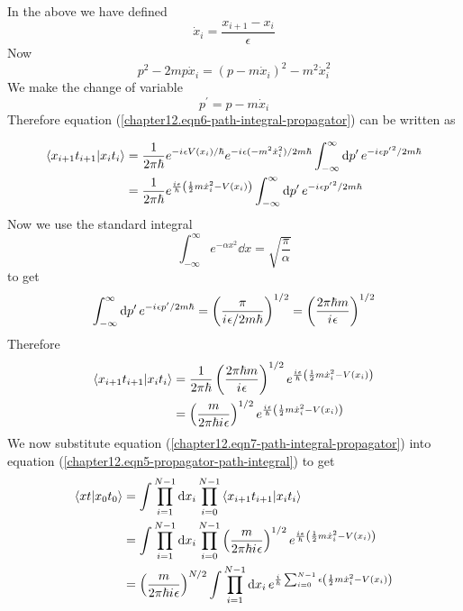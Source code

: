 	In the above we have defined
	\begin{equation}
		\dot{x}_i = \frac{x_{i+1} - x_i}{\epsilon}
	\end{equation}
	Now
	\begin{equation}
		p^2 - 2m p \dot{x}_i = (p- m \dot{x}_i)^2 - m^2 \dot{x}_i^2
	\end{equation}
	We make the change of variable
	\begin{equation}
		p^\prime = p -m \dot{x}_i
	\end{equation}
	Therefore equation (\ref{chapter12.eqn6-path-integral-propagator}) can be written as
	
	\begin{align}
		\braket{x_{i+1} t_{i+1}}{x_i t_i} 
		&= \frac{1}{2 \pi \hbar} e^{-{i\mkern1mu} \epsilon V(x_i)/\hbar} e^{-{i\mkern1mu} \epsilon (-m^2 \dot{x}_i^2) / 2 m \hbar}  \int_{-\infty}^{\infty} \dd{p^\prime} e^{-{i\mkern1mu} \epsilon {p^\prime}^2 / 2 m \hbar} \\
		&= \frac{1}{2 \pi \hbar} e^{\frac{{i\mkern1mu} \epsilon}{\hbar} \left(\frac{1}{2} m \dot{x}_i^2 - V(x_i)\right)} \int_{-\infty}^{\infty} \dd{p^\prime} e^{-{i\mkern1mu} \epsilon {p^\prime}^2 / 2 m \hbar}
	\end{align}
	Now we use the standard integral
	\begin{equation}
		\int_{-\infty}^{\infty} e^{-\alpha x^2} \dd{x} = \sqrt{\frac{\pi}{\alpha}}
	\end{equation}
	to get
	\begin{equation}
		\int_{-\infty}^{\infty} \dd{p^\prime} e^{-{i\mkern1mu} \epsilon p^\prime / 2 m \hbar} = \left(\frac{\pi}{{i\mkern1mu} \epsilon/2 m \hbar}\right)^{1/2} = \left(\frac{2 \pi \hbar m}{{i\mkern1mu} \epsilon}\right)^{1/2}
	\end{equation}
	Therefore
	\begin{align}
		\braket{x_{i+1} t_{i+1}}{x_i t_i} 
		&= \frac{1}{2 \pi \hbar} \left(\frac{2 \pi \hbar m}{{i\mkern1mu} \epsilon}\right)^{1/2} e^{\frac{{i\mkern1mu} \epsilon}{\hbar} \left(\frac{1}{2} m \dot{x}_i^2 - V(x_i)\right)} \\
		&= \left(\frac{m}{2\pi\hbar{i\mkern1mu} \epsilon}\right)^{1/2} e^{\frac{{i\mkern1mu} \epsilon}{\hbar} \left(\frac{1}{2} m \dot{x}_i^2 - V(x_i)\right)}
		\label{chapter12.eqn7-path-integral-propagator}
	\end{align}
	We now substitute equation (\ref{chapter12.eqn7-path-integral-propagator}) into equation (\ref{chapter12.eqn5-propagator-path-integral}) to get
	\begin{align}
		\braket{x t}{x_0 t_0} 
		&= \int \prod_{i=1}^{N-1} \dd{x_i} \prod_{i=0}^{N-1} \braket{x_{i+1} t_{i+1}}{x_i t_i}\\
		&= \int \prod_{i=1}^{N-1} \dd{x_i} \prod_{i=0}^{N-1} \left(\frac{m}{2 \pi \hbar {i\mkern1mu} \epsilon}\right)^{1/2} e^{\frac{{i\mkern1mu} \epsilon}{\hbar} \left(\frac{1}{2} m \dot{x}_i^2 - V(x_i)\right)} \\
		&= \left(\frac{m}{2 \pi \hbar {i\mkern1mu} \epsilon}\right)^{N/2} \int \prod_{i=1}^{N-1} \dd{x_i}e^{\frac{{i\mkern1mu}}{\hbar} \sum_{i=0}^{N-1} \epsilon \left(\frac{1}{2} m \dot{x}_i^2 - V(x_i)\right)}
		\label{chapter12.eqn8-path-integral-propagator}
	\end{align}
